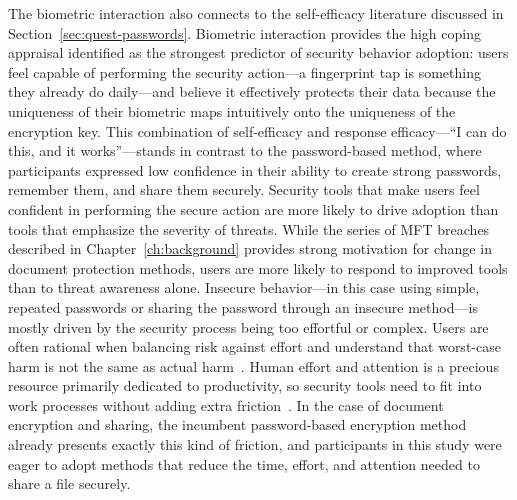 The biometric interaction also connects to the self-efficacy literature discussed in Section~\ref{sec:quest-passwords}. Biometric interaction provides the high coping appraisal identified as the strongest predictor of security behavior adoption: users feel capable of performing the security action---a fingerprint tap is something they already do daily---and believe it effectively protects their data because the uniqueness of their biometric maps intuitively onto the uniqueness of the encryption key. This combination of self-efficacy and response efficacy---``I can do this, and it works''---stands in contrast to the password-based method, where participants expressed low confidence in their ability to create strong passwords, remember them, and share them securely. Security tools that make users feel confident in performing the secure action are more likely to drive adoption than tools that emphasize the severity of threats. While the series of MFT breaches described in Chapter~\ref{ch:background} provides strong motivation for change in document protection methods, users are more likely to respond to improved tools than to threat awareness alone. Insecure behavior---in this case using simple, repeated passwords or sharing the password through an insecure method---is mostly driven by the security process being too effortful or complex. Users are often rational when balancing risk against effort and understand that worst-case harm is not the same as actual harm~\cite{herley_so_2009}. Human effort and attention is a precious resource primarily dedicated to productivity, so security tools need to fit into work processes without adding extra friction~\cite{enisa_cybersecurity_2019}. In the case of document encryption and sharing, the incumbent password-based encryption method already presents exactly this kind of friction, and participants in this study were eager to adopt methods that reduce the time, effort, and attention needed to share a file securely.


